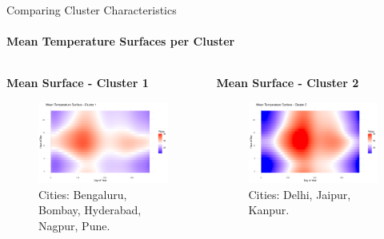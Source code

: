 \documentclass[svgnames, 12pt]{beamer}
\begin{document}
\begin{frame}{Comparing Cluster Characteristics}
  \framesubtitle{Mean Temperature Surfaces per Cluster}
  \begin{columns}[T]
    \begin{column}{0.5\textwidth}
      \textbf{Mean Surface - Cluster 1}
      \begin{figure}
        \includegraphics[width=\linewidth]{../data/output/figures/mean_surface_cluster_1.png}
        \caption*{\tiny Cities: Bengaluru, Bombay, Hyderabad, Nagpur, Pune.}
      \end{figure}
    \end{column}
    \begin{column}{0.5\textwidth}
      \textbf{Mean Surface - Cluster 2}
      \begin{figure}
        \includegraphics[width=\linewidth]{../data/output/figures/mean_surface_cluster_2.png}
        \caption*{\tiny Cities: Delhi, Jaipur, Kanpur.}

\end{figure}
\end{column}
\end{columns}
\end{frame}
\end{document}
